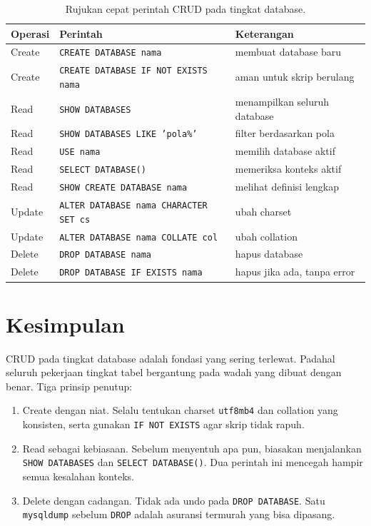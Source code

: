 \documentclass[11pt,a4paper]{article}
\begin{document}
\begin{table}[H]
	\centering
	\caption{Rujukan cepat perintah CRUD pada tingkat database.}
	\label{tab:cheat}
	\footnotesize
	\begin{tabularx}{\textwidth}{l l X}
		\toprule
		Operasi & Perintah                                      & Keterangan                   \\
		\midrule
		Create  & \texttt{CREATE DATABASE nama}                 & membuat database baru        \\
		Create  & \texttt{CREATE DATABASE IF NOT EXISTS nama}   & aman untuk skrip berulang    \\
		Read    & \texttt{SHOW DATABASES}                       & menampilkan seluruh database \\
		Read    & \texttt{SHOW DATABASES LIKE 'pola\%'}         & filter berdasarkan pola      \\
		Read    & \texttt{USE nama}                             & memilih database aktif       \\
		Read    & \texttt{SELECT DATABASE()}                    & memeriksa konteks aktif      \\
		Read    & \texttt{SHOW CREATE DATABASE nama}            & melihat definisi lengkap     \\
		Update  & \texttt{ALTER DATABASE nama CHARACTER SET cs} & ubah charset                 \\
		Update  & \texttt{ALTER DATABASE nama COLLATE col}      & ubah collation               \\
		Delete  & \texttt{DROP DATABASE nama}                   & hapus database               \\
		Delete  & \texttt{DROP DATABASE IF EXISTS nama}         & hapus jika ada, tanpa error  \\
		\bottomrule
	\end{tabularx}
\end{table}

\section{Kesimpulan}

CRUD pada tingkat database adalah fondasi yang sering terlewat. Padahal seluruh pekerjaan tingkat tabel bergantung pada wadah yang dibuat dengan benar. Tiga prinsip penutup:

\begin{enumerate}
	\item Create dengan niat. Selalu tentukan charset \texttt{utf8mb4} dan collation yang konsisten, serta gunakan \texttt{IF NOT EXISTS} agar skrip tidak rapuh.
	\item Read sebagai kebiasaan. Sebelum menyentuh apa pun, biasakan menjalankan \texttt{SHOW DATABASES} dan \texttt{SELECT DATABASE()}. Dua perintah ini mencegah hampir semua kesalahan konteks.
	\item Delete dengan cadangan. Tidak ada undo pada \texttt{DROP DATABASE}. Satu \texttt{mysqldump} sebelum \texttt{DROP} adalah asuransi termurah yang bisa dipasang.
\end{enumerate}
\end{document}
